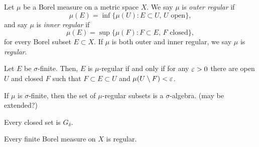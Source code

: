 \documentclass{../../large}
\begin{document}
\begin{prb}
Let $\mu$ be a Borel measure on a metric space $X$.
We say $\mu$ is \emph{outer regular} if
\[\mu(E)=\inf\{\mu(U):E\subset U,\,U\text{ open}\},\]
and say $\mu$ is \emph{inner regular} if
\[\mu(E)=\sup\{\mu(F):F\subset E,\,F\text{ closed}\},\]
for every Borel subset $E\subset X$.
If $\mu$ is both outer and inner regular, we say $\mu$ is \emph{regular}.
\begin{parts}
\item Let $E$ be $\sigma$-finite. Then, $E$ is $\mu$-regular if and only if for any $\varepsilon>0$ there are open $U$ and closed $F$ such that $F\subset E\subset U$ and $\mu(U\setminus F)<\varepsilon$.
\item If $\mu$ is $\sigma$-finite, then the set of $\mu$-regular subsets is a $\sigma$-algebra. (may be extended?)
\item Every closed set is $G_\delta$.
\item Every finite Borel measure on $X$ is regular.
\end{parts}
\end{prb}
\begin{pf}
\end{pf}
\end{document}
